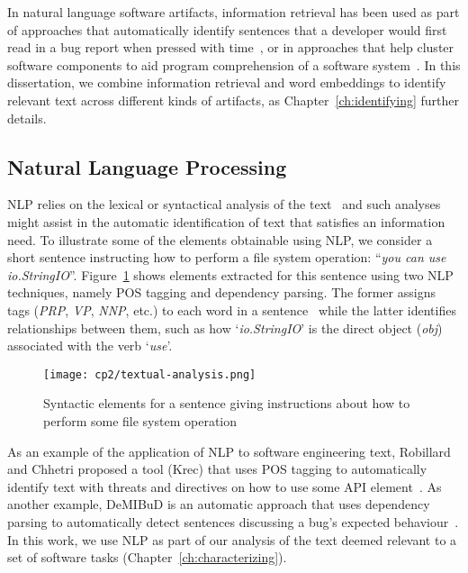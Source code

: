 
In natural language software artifacts, 
information retrieval has been used 
as part of approaches that
automatically identify sentences  that a developer would first read in a bug report 
when pressed with time~\cite{Lotufo2012},
or in approaches that help cluster software components to aid program comprehension of a software system~\cite{Marcus2003}.
In this dissertation, we combine information retrieval and word embeddings 
to identify relevant text across different kinds of artifacts, as Chapter~\ref{ch:identifying} further details.



\subsection{Natural Language Processing }
\label{cp2:nlp}


\acf{NLP} relies on the lexical or syntactical analysis of the text~\cite{jurafsky2014speech}
and such analyses might assist in the automatic identification of text that satisfies an information need. 
To illustrate some of the elements obtainable using \acs{NLP}, we consider a short sentence 
instructing how to perform a file system operation: ``\textit{you can use io.StringIO}''.
Figure~\ref{fig:nlp-analysis} shows elements extracted for this sentence using two \acs{NLP} techniques,
namely \acf{POS} tagging and dependency parsing.
The former assigns tags  ({\small \textit{PRP}, \textit{VP}, \textit{NNP},} etc.) to each word 
in a sentence~\cite{taylor2003penn} while the latter identifies
relationships between them, such as how 
`\textit{io.StringIO}' is the direct object (\textit{obj})
associated with the verb `\textit{use}'.



\medskip
\begin{figure}[h!]
    \centering
    \texttt{[image: cp2/textual-analysis.png]}
    \caption{Syntactic elements for a sentence giving instructions about how to perform some file system operation}
    \label{fig:nlp-analysis}
\end{figure}


As an example of the application of \ac{NLP} to software engineering text,
Robillard  and Chhetri proposed a tool (Krec)
that uses \acs{POS} tagging to automatically 
identify text with threats and directives on how to use some API element~\cite{Robillard2015}.
As another example, {\small DeMIBuD}
is an automatic approach that uses dependency parsing
to automatically detect sentences discussing a bug's expected behaviour~\cite{Chaparro2017}.
In this work, we use \acs{NLP} as part of our 
analysis of the text deemed relevant to a set of software tasks (Chapter~\ref{ch:characterizing}).



